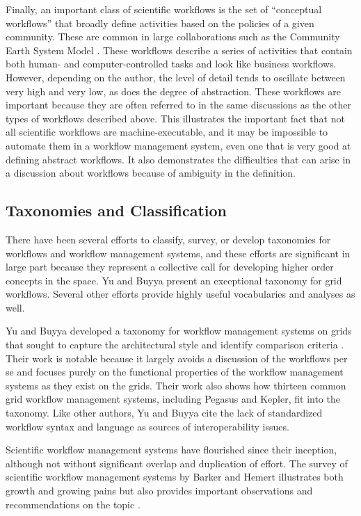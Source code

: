 Finally, an important class of scientific workflows is the set of ``conceptual
workflows'' that broadly define activities based on the policies of a given
community. These are common in large collaborations such as the Community Earth
System Model \cite{noauthor_cesm_nodate}. These workflows describe a
series of activities that contain both human- and computer-controlled tasks
and look like business workflows. However, depending on the author, the level of detail tends to
oscillate between very high and very low, as does the degree of abstraction. These workflows are important because they are often
referred to in the same discussions as the other types of workflows described
above. This illustrates the important fact that not all scientific workflows are
machine-executable, and it may be impossible to automate them in a workflow
management system, even one that is very good at defining abstract workflows. It
also demonstrates the difficulties that can arise in a discussion about workflows
because of ambiguity in the definition.

\subsection{Taxonomies and Classification}\label{taxonomies-and-classification}
There have been several efforts to classify, survey, or develop taxonomies for
workflows and workflow management systems, and these efforts are significant in
large part because they represent a collective call for developing higher order
concepts in the space. Yu and Buyya present an exceptional taxonomy for grid
workflows. Several other efforts provide highly useful vocabularies and
analyses as well.

Yu and Buyya developed a taxonomy for workflow management systems on grids that
sought to capture the architectural style and identify comparison criteria
\cite{yu_taxonomy_2005}. Their work is notable because it largely avoids a
discussion of the workflows per se and focuses purely on the functional
properties of the workflow management systems as they exist on the grids. Their
work also shows how thirteen common grid workflow management systems, including
Pegasus and Kepler, fit into the taxonomy. Like other authors, Yu and Buyya
cite the lack of standardized workflow syntax and language as sources of
interoperability issues.

Scientific workflow management systems have flourished since their inception,
although not without significant overlap and duplication of effort. The survey
of scientific workflow management systems by Barker and Hemert illustrates both
growth and growing pains but also provides important observations and
recommendations on the topic \cite{barker_scientific_2007}.


